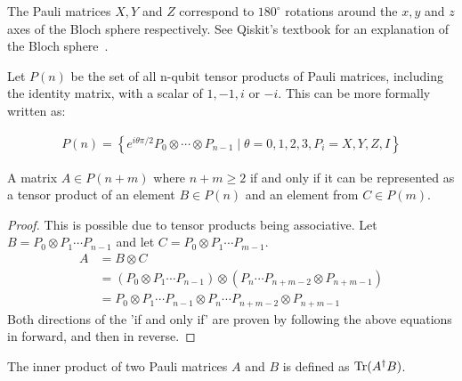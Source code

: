 The Pauli matrices $X,Y$ and $Z$ correspond to $180^{\circ}$ rotations around the $x,y$ and $z$ axes of the Bloch sphere respectively. See Qiskit's textbook for an explanation of the Bloch sphere~\cite{Qiskit-Textbook}.

Let $P(n)$ be the set of all n-qubit tensor products of Pauli matrices, including the identity matrix, with a scalar of $1, -1, i$ or $-i$. This can be more formally written as:

\begin{align}
\label{eq:pauliDefinition}
P(n)=\left\{ e^{i\theta\pi/2} P_0 \otimes \cdots \otimes P_{n-1} \mid \theta = 0,1,2,3, P_i = X,Y,Z,I\right\}
\end{align}

\begin{theorem}
\label{theoremPauli}
A matrix $A \in P(n + m)$ where $n + m \geq 2$ if and only if it can be represented as a tensor product of an element $B \in P(n)$ and an element from $C \in P(m)$.
\end{theorem}
\begin{proof}
This is possible due to tensor products being associative. Let $B = P_0 \otimes P_1 \cdots P_{n-1}$ and let $C =  P_0 \otimes P_1 \cdots P_{m-1}$.
\begin{align}
A &=B \otimes C \\
&= (P_0 \otimes P_1 \cdots P_{n-1}) \otimes (P_{n} \cdots P_{n+m-2} \otimes P_{n+m-1}) \\
&= P_0 \otimes P_1 \cdots P_{n-1} \otimes P_n \cdots P_{n+m-2} \otimes P_{n+m-1}
\end{align}
Both directions of the 'if and only if' are proven by following the above equations in forward, and then in reverse.
\end{proof}

The inner product of two Pauli matrices $A$ and $B$ is defined as $\operatorname{Tr} (A^{\dagger} B)$.

